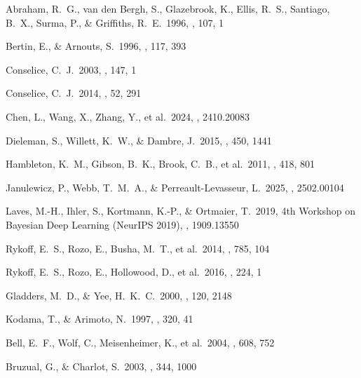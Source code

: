 \documentclass[twocolumn,10pt]{aastex631}
\begin{document}
\begin{thebibliography}{99}

Abraham, R.~G., van den Bergh, S., Glazebrook, K., Ellis, R.~S., Santiago, B.~X., Surma, P., \& Griffiths, R.~E.\ 1996, \apjs, 107, 1

Bertin, E., \& Arnouts, S.\ 1996, \aaps, 117, 393

Conselice, C.~J.\ 2003, \apjs, 147, 1

Conselice, C.~J.\ 2014, \araa, 52, 291

Chen, L., Wang, X., Zhang, Y., et al.\ 2024, \arxiv, 2410.20083

Dieleman, S., Willett, K.~W., \& Dambre, J.\ 2015, \mnras, 450, 1441

Hambleton, K.~M., Gibson, B.~K., Brook, C.~B., et al.\ 2011, \mnras, 418, 801

Janulewicz, P., Webb, T.~M.~A., \& Perreault-Levasseur, L.\ 2025, \arxiv, 2502.00104

Laves, M.-H., Ihler, S., Kortmann, K.-P., \& Ortmaier, T.\ 2019, 4th Workshop on Bayesian Deep Learning (NeurIPS 2019), \arxiv, 1909.13550

Rykoff, E.~S., Rozo, E., Busha, M.~T., et al.\ 2014, \apj, 785, 104

Rykoff, E.~S., Rozo, E., Hollowood, D., et al.\ 2016, \apjs, 224, 1

Gladders, M.~D., \& Yee, H.~K.~C.\ 2000, \aj, 120, 2148

Kodama, T., \& Arimoto, N.\ 1997, \aap, 320, 41

Bell, E.~F., Wolf, C., Meisenheimer, K., et al.\ 2004, \apj, 608, 752

Bruzual, G., \& Charlot, S.\ 2003, \mnras, 344, 1000

\end{thebibliography}
\end{document}
